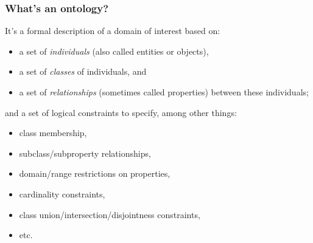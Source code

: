 \documentclass{beamer}
\begin{document}
\begin{frame}
  \frametitle{What's an ontology?}

  \pause

  It's a formal description of a domain of interest based on:

  \pause

  \begin{itemize}
    \item a set of \textit{individuals} (also called entities or objects),

    \pause

    \item a set of \textit{classes} of individuals, and

    \pause

    \item a set of \textit{relationships} (sometimes called properties)
      between these individuals;
  \end{itemize}

  \pause

  and a set of logical constraints to specify, among other things:

  \pause

  \begin{itemize}
    \item class membership,

    \pause

    \item subclass/subproperty relationships,

    \pause

    \item domain/range restrictions on properties,

    \pause

    \item cardinality constraints,

    \pause

    \item class union/intersection/disjointness constraints,

    \pause

    \item etc.
  \end{itemize}
\end{frame}
\end{document}
